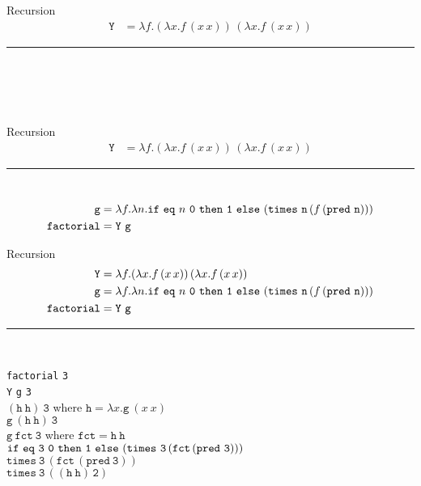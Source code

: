 \documentclass{beamer}
\newcommand{\mkw}[1]{{\bf \mathtt{#1}}}
\newcommand{\sym}[1]{\texttt{#1}}
\newcommand{\msym}[1]{\mathtt{#1}}
\newcommand{\hr}[0]{\rule{10.75cm}{0.4pt}\\}
\begin{document}
\begin{frame}{Recursion}
\begin{align*}
\msym{Y} &= \lambda f.(\lambda x.f\,(x\,x))\,(\lambda x.f\,(x\,x))
\end{align*}
\hr
\begin{align*}
\phantom{\msym{g} = \lambda f.\lambda
n.\mkw{if}\ \msym{eq}\ n\ \msym{0}\ \mkw{then}\ \msym{1}\ \mkw{else}\ (\msym{times}\ \msym{n}\,(f\,(\msym{pred}\ \msym{n})))} \\
\phantom{\msym{factorial} = \msym{Y}\ \msym{g}}
\end{align*}
\end{frame}
\begin{frame}{Recursion}
\begin{align*}
\msym{Y} &= \lambda f.(\lambda x.f\,(x\,x))\,(\lambda x.f\,(x\,x))
\end{align*}
\hr
\begin{align*}
\msym{g} &= \lambda f.\lambda
n.\mkw{if}\ \msym{eq}\ n\ \msym{0}\ \mkw{then}\ \msym{1}\ \mkw{else}\ (\msym{times}\ \msym{n}\,(f\,(\msym{pred}\ \msym{n}))) \\
\msym{factorial} &= \msym{Y}\ \msym{g}
\end{align*}
\end{frame}
\begin{frame}{Recursion}
\begin{align*}
\msym{Y} &= \lambda f.(\lambda x.f\,(x\,x))\,(\lambda x.f\,(x\,x)) \\
\msym{g} &= \lambda f.\lambda
n.\mkw{if}\ \msym{eq}\ n\ \msym{0}\ \mkw{then}\ \msym{1}\ \mkw{else}\ (\msym{times}\ \msym{n}\,(f\,(\msym{pred}\ \msym{n}))) \\
\msym{factorial} &= \msym{Y}\ \msym{g}
\end{align*}
\hr
\begin{tabbing}
\sym{factorial} \sym{3} ~~~~~~~~~~~~~~~~~~~ \= \\
\sym{Y} \sym{g} \sym{3} \> \\
$(\msym{h}\ \msym{h})\ \msym{3}$ \> where $\msym{h}=\lambda x.\msym{g}\ (x\ x)$ \\
$\msym{g}\ (\msym{h}\ \msym{h})\ \msym{3}$ \> \\
$\msym{g}\ \msym{fct}\ \msym{3}$ \> where $\msym{fct}=\msym{h}\ \msym{h}$ \\
$\mkw{if}\ \msym{eq}\ \msym{3}\ \msym{0}\ \mkw{then}\ \msym{1}\ \mkw{else}\ (\msym{times}\ \msym{3}\,(\msym{fct}\,(\msym{pred}\ \msym{3})))$ \> \\
$\msym{times}\ \msym{3}\,(\msym{fct}\,(\msym{pred}\ \msym{3}))$ \> \\
$\msym{times}\ \msym{3}\,((\msym{h}\ \msym{h})\,\msym{2})$ \>
\end{tabbing}
\end{frame}
\end{document}
